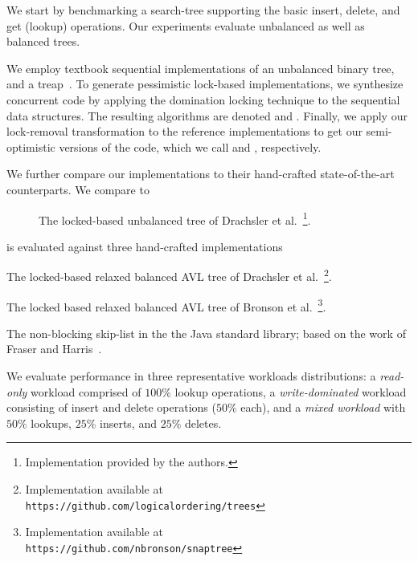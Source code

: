 We start by benchmarking a search-tree supporting the basic insert,
delete, and get (lookup) operations. Our experiments evaluate unbalanced as well
as balanced trees.  

We employ textbook sequential implementations of an unbalanced binary
tree, and a treap~\cite{AragonS1989}. To
generate pessimistic lock-based implementations, we synthesize
concurrent code by applying the domination locking technique to the sequential
data structures. The resulting algorithms are denoted \domTree and \domTreap.
Finally, we apply our lock-removal transformation to the reference
implementations to get our semi-optimistic versions of the code, which we call
\autoTree and \autoTreap, respectively.     

We further compare our implementations to their hand-crafted state-of-the-art counterparts. We compare \autoTree to
\begin{description}
\item[\danaTree] The locked-based 
				unbalanced tree of Drachsler et
				al.~\cite{DrachslerVY2014}\footnote{Implementation provided by the authors.}.
\end{description}
\autoTreap is evaluated against three hand-crafted implementations
\begin{description}
\setlength{\itemsep}{0pt}
\setlength{\parskip}{0pt}
\item[\danaAVL] The locked-based relaxed balanced AVL tree of 
				Drachsler et al.~\cite{DrachslerVY2014}\footnote{Implementation available at \\
				\texttt{https://github.com/logicalordering/trees}}.
\item[\bronson] The locked based relaxed balanced AVL tree
				of Bronson et al.~\cite{BronsonCCO2010}\footnote{Implementation available at \\
				\texttt{https://github.com/nbronson/snaptree}}.
\item[\skiplist] The non-blocking skip-list in the 
				the Java standard library; based on the work of
				Fraser and Harris~\cite{fraser2004practical}.
\end{description}


We evaluate performance in three representative workloads distributions: a
\emph{read-only} workload comprised of $100\%$ lookup operations, a \emph{write-dominated}
workload consisting of insert and delete operations ($50\%$ each), and a
\emph{mixed workload} with $50\%$ lookups, $25\%$ inserts, and $25\%$
deletes.

